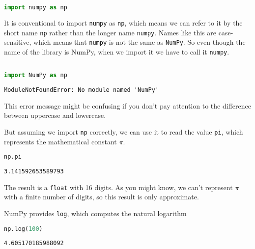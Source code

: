 \begin{lstlisting}[language=Python,style=source]
import numpy as np
\end{lstlisting}

It is conventional to import \passthrough{\lstinline!numpy!} as
\passthrough{\lstinline!np!}, which means we can refer to it by the
short name \passthrough{\lstinline!np!} rather than the longer name
\passthrough{\lstinline!numpy!}. Names like this are case-sensitive,
which means that \passthrough{\lstinline!numpy!} is not the same as
\passthrough{\lstinline!NumPy!}. So even though the name of the library
is NumPy, when we import it we have to call it
\passthrough{\lstinline!numpy!}.

\begin{lstlisting}[language=Python,style=source]
%%expect ModuleNotFoundError

import NumPy as np
\end{lstlisting}

\begin{lstlisting}[style=output]
ModuleNotFoundError: No module named 'NumPy'
\end{lstlisting}

This error message might be confusing if you don't pay attention to the
difference between uppercase and lowercase.

But assuming we import \passthrough{\lstinline!np!} correctly, we can
use it to read the value \passthrough{\lstinline!pi!}, which represents
the mathematical constant \(\pi\).

\begin{lstlisting}[language=Python,style=source]
np.pi
\end{lstlisting}

\begin{lstlisting}[style=output]
3.141592653589793
\end{lstlisting}

The result is a \passthrough{\lstinline!float!} with 16 digits. As you
might know, we can't represent \(\pi\) with a finite number of digits,
so this result is only approximate.

NumPy provides \passthrough{\lstinline!log!}, which computes the natural
logarithm

\begin{lstlisting}[language=Python,style=source]
np.log(100)
\end{lstlisting}

\begin{lstlisting}[style=output]
4.605170185988092
\end{lstlisting}

